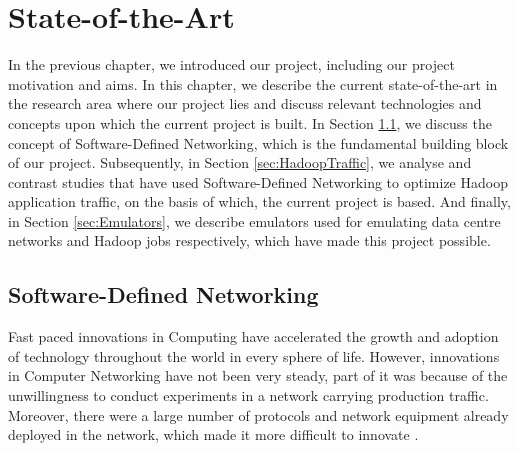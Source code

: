 \chapter{State-of-the-Art} \label{chap:State}

In the previous chapter, we introduced our project, including our project motivation and aims. In this chapter, we describe the current state-of-the-art in the research area where our project lies and discuss relevant technologies and concepts upon which the current project is built. In Section \ref{sec:SDN}, we discuss the concept of Software-Defined Networking, which is the fundamental building block of our project. Subsequently, in Section \ref{sec:HadoopTraffic}, we analyse and contrast studies that have used Software-Defined Networking to optimize Hadoop application traffic, on the basis of which, the current project is based. And finally, in Section \ref{sec:Emulators}, we describe emulators used for emulating data centre networks and Hadoop jobs respectively, which have made this project possible. 

\section{Software-Defined Networking} \label{sec:SDN}

Fast paced innovations in Computing have accelerated the growth and adoption of technology throughout the world in every sphere of life. However, innovations in Computer Networking have not been very steady, part of it was because of the unwillingness to conduct experiments in a network carrying production traffic. Moreover, there were a large number of protocols and network equipment already deployed in the network, which made it more difficult to innovate \cite{mckeown2008openflow}. 

